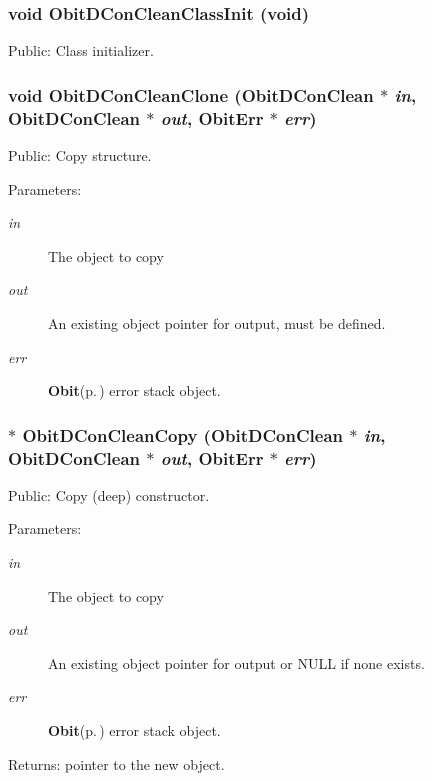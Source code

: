 \subsubsection{\setlength{\rightskip}{0pt plus 5cm}void Obit\-DCon\-Clean\-Class\-Init (void)}\label{ObitDConClean_8h_a12}


Public: Class initializer. 

\subsubsection{\setlength{\rightskip}{0pt plus 5cm}void Obit\-DCon\-Clean\-Clone ({\bf Obit\-DCon\-Clean} $\ast$ {\em in}, {\bf Obit\-DCon\-Clean} $\ast$ {\em out}, {\bf Obit\-Err} $\ast$ {\em err})}\label{ObitDConClean_8h_a17}


Public: Copy structure. 

\begin{Desc}
\item[Parameters:]
\begin{description}
\item[{\em in}]The object to copy \item[{\em out}]An existing object pointer for output, must be defined. \item[{\em err}]{\bf Obit}{\rm (p.\,\pageref{structObit})} error stack object. \end{description}
\end{Desc}
\subsubsection{$\ast$ Obit\-DCon\-Clean\-Copy ({\bf Obit\-DCon\-Clean} $\ast$ {\em in}, {\bf Obit\-DCon\-Clean} $\ast$ {\em out}, {\bf Obit\-Err} $\ast$ {\em err})}\label{ObitDConClean_8h_a16}


Public: Copy (deep) constructor. 

\begin{Desc}
\item[Parameters:]
\begin{description}
\item[{\em in}]The object to copy \item[{\em out}]An existing object pointer for output or NULL if none exists. \item[{\em err}]{\bf Obit}{\rm (p.\,\pageref{structObit})} error stack object. \end{description}
\end{Desc}
\begin{Desc}
\item[Returns:]pointer to the new object. \end{Desc}
